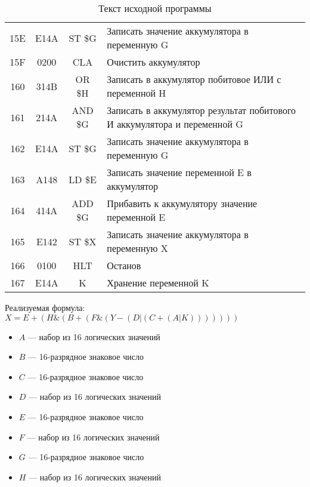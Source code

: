 \begin{table}[h!]
\begin{longtable}{| c | c | c | p{9.5cm} |}
        15E   & E14A        & ST \$G    & Записать значение аккумулятора в переменную G                              \\ %
        15F   & 0200        & CLA       & Очистить аккумулятор                                                \\
        160   & 314B        & OR \$H    & Записать в аккумулятор побитовое ИЛИ с переменной H               \\ %
        161   & 214A        & AND \$G   & Записать в аккумулятор результат побитового И аккумулятора и переменной G  \\ %
        162   & E14A        & ST \$G    & Записать значение аккумулятора в переменную G                              \\ %
        163   & A148        & LD \$E    & Записать значение переменной E в аккумулятор                               \\ %
        164   & 414A        & ADD \$G   & Прибавить к аккумулятору значение переменной E                             \\ %
        165   & E142        & ST \$X    & Записать значение аккумулятора в переменную X                              \\ %
        166   & 0100        & HLT       & Останов                                                                    \\
        \hline
        167   & E14A        & K         & Хранение переменной K                                                      \\
        \hline
    \end{longtable}
    \caption{Текст исходной программы}
\end{table}

Реализуемая формула: $X = E + (H \& (B + (F \& (Y - (D | (C + (A | K)))))))$
\begin{itemize}
    \item $A$ --- набор из 16 логических значений
    \item $B$ --- 16-разрядное знаковое число
    \item $C$ --- 16-разрядное знаковое число
    \item $D$ --- набор из 16 логических значений
    \item $E$ --- 16-разрядное знаковое число
    \item $F$ --- набор из 16 логических значений
    \item $G$ --- 16-разрядное знаковое число
    \item $H$ --- набор из 16 логических значений
\end{itemize}


